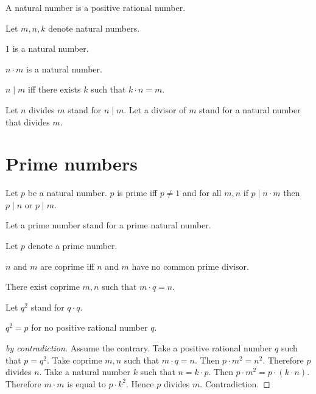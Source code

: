 \documentclass{article}
\begin{document}
  \begin{forthel}
    \begin{signature}
      A natural number is a positive rational number.
    \end{signature}

    Let $m, n, k$ denote natural numbers.

    \begin{signature}
        $1$ is a natural number.
    \end{signature}

    \begin{axiom}
      $n \cdot m$ is a natural number.
    \end{axiom}

    \begin{definition}
      $n \mid m$ iff there exists $k$ such that $k \cdot n = m$.
    \end{definition}

    Let $n$ divides $m$ stand for $n \mid m$.
    Let a divisor of $m$ stand for a natural number that divides $m$.
  \end{forthel}

  \section*{Prime numbers}

  \begin{forthel}
    \begin{definition}
      Let $p$ be a natural number.
      $p$ is prime iff $p\neq 1$ and for all $m, n$
      if $p\mid n\cdot m$ then $p \mid n$ or $p \mid m$.
    \end{definition}

    Let a prime number stand for a prime natural number.

    Let $p$ denote a prime number.

    \begin{definition}
      $n$ and $m$ are coprime iff $n$ and $m$ have no common prime divisor.
    \end{definition}

    \begin{axiom}
      There exist coprime $m,n$ such that $m \cdot q = n$.
    \end{axiom}

    Let $q^{2}$ stand for $q \cdot q$.

    \begin{proposition}
      $q^{2} = p$ for no positive rational number $q$.
    \end{proposition}
    \begin{proof}[by contradiction]
      Assume the contrary.
      Take a positive rational number $q$ such that $p = q^{2}$.
      Take coprime $m,n$ such that $m \cdot q = n$.
      Then $p \cdot m^{2} = n^{2}$.
      Therefore $p$ divides $n$.
      Take a natural number $k$ such that $n = k \cdot p$.
      Then $p \cdot m^{2} = p \cdot (k \cdot n)$.
      Therefore $m \cdot m$ is equal to $p \cdot k^{2}$.
      Hence $p$ divides $m$.
      Contradiction.
    \end{proof}
  \end{forthel}
\end{document}
